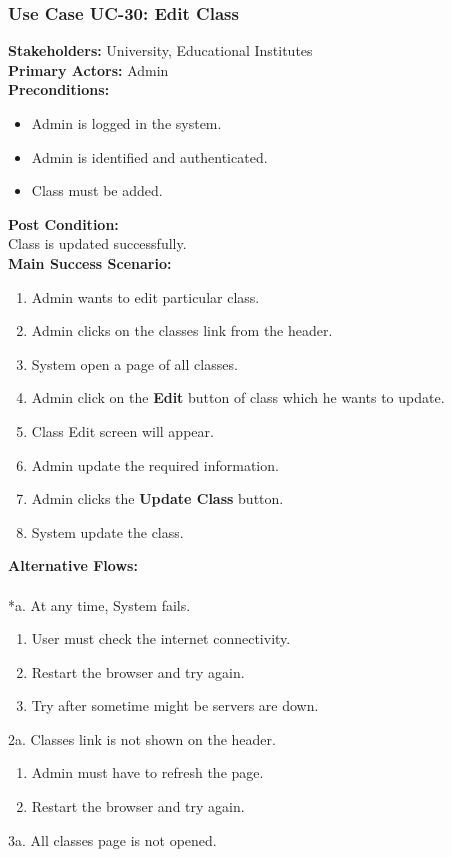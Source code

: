 \documentclass[12pt]{article}
\begin{document}
\subsubsection{Use Case UC-30: Edit Class}
\textbf{Stakeholders: } University, Educational Institutes \\
\textbf{Primary Actors: } Admin \\
\textbf{Preconditions:}
\begin{itemize}
\item Admin is logged in the system.
\item Admin is identified and authenticated.
\item Class must be added.
\end{itemize}
\textbf{Post Condition: }\\
Class is updated successfully.\\
\textbf{Main Success Scenario:}
\begin{enumerate}
\item Admin wants to edit particular class.
\item Admin clicks on the classes link from the header.
\item System open a page of all classes.
\item Admin click on the \textbf{Edit} button of class which he wants to update.
\item Class Edit screen will appear.
\item Admin update the required information.
\item Admin clicks the \textbf{Update Class} button.
\item System update the class.
\end{enumerate}
\textbf{Alternative Flows:}\\
\\
*a. At any time, System fails.
\begin{enumerate}
\item User must check the internet connectivity.
\item Restart the browser and try again.
\item Try after sometime might be servers are down.
\end{enumerate}
2a. Classes link is not shown on the header.
\begin{enumerate}
\item Admin must have to refresh the page.
\item Restart the browser and try again.
\end{enumerate} 
3a. All classes page is not opened.
\end{document}
